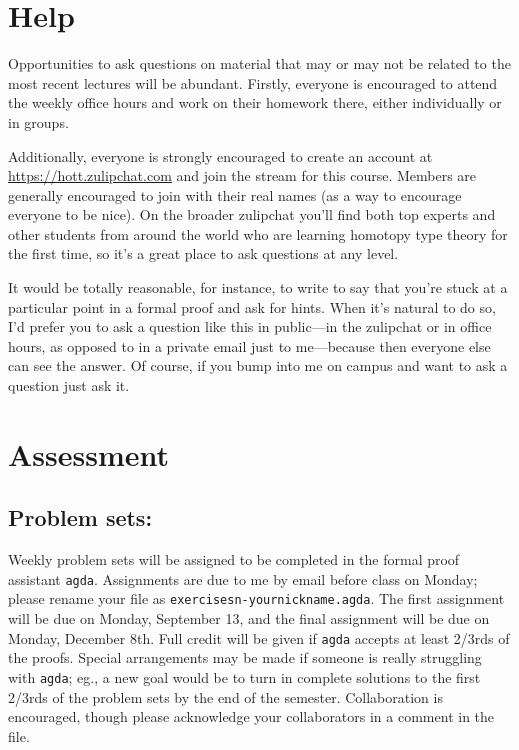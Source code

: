 \documentclass{amsart}
\theoremstyle{definition}
\theoremstyle{remark}
\numberwithin{equation}{section}
\begin{document}
\section*{Help}

Opportunities to ask questions on material that may or may not be related to the most recent lectures will be abundant. Firstly, everyone is encouraged to attend the weekly office hours and work on their homework there, either individually or in groups. 

Additionally, everyone is strongly encouraged to create an account at \url{https://hott.zulipchat.com} and join the stream for this course. Members are generally encouraged to join with their real names (as a way to encourage everyone to be nice). On the broader zulipchat you'll find both top experts and other students from around the world who are learning homotopy type theory for the first time, so it's a great place to ask questions at any level. 

It would be totally reasonable, for instance, to write to say that you're stuck at a particular point in a formal proof and ask for hints. When it's natural to do so, I'd prefer you to ask a question like this in public---in the zulipchat or in office hours, as opposed to in a private email just to me---because then everyone else can see the answer. Of course, if you bump into me on campus and want to ask a question just ask it.

\section*{Assessment}

\subsection*{Problem sets:}
Weekly problem sets will be assigned to be completed in the formal proof assistant \texttt{agda}. Assignments are due to me by email before class on Monday; please rename your file as \texttt{exercisesn-yournickname.agda}. The first assignment will be due on Monday, September 13, and the final assignment will be due on Monday, December 8th. Full credit will be given if \texttt{agda} accepts at least 2/3rds of the proofs. Special arrangements may be made if someone is really struggling with \texttt{agda}; eg., a new goal would be to turn in complete solutions to the first 2/3rds of the problem sets by the end of the semester. Collaboration is encouraged, though please acknowledge your collaborators in a comment in the file.
\end{document}
